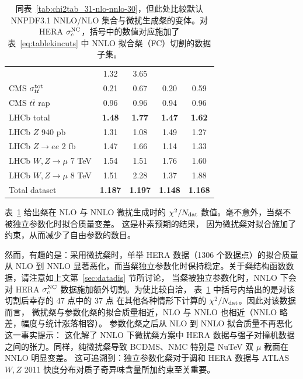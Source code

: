 \begin{table}[h]
\begin{center}
\begin{tabular}{|l|c|c||c|c|}
 &    1.32    &   3.65 \\
CMS $\sigma_{tt}^{\rm tot}$        &   0.21      &   0.67  &    0.20      &   0.59  \\
CMS $t\bar{t}$ rap       &   0.96      &   0.96
&    0.94      &   0.96 \\
\hline 
LHCb total      &   {\bf 1.48}      &  {\bf 1.77 }
&  {\bf  1.47}      &   {\bf 1.62}  \\
LHCb $Z$ 940 pb      &   1.31     &   1.08 &    1.49      &   1.27  \\
LHCb $Z\to ee$ 2 fb      &   1.47     &   1.66
 &    1.14      &   1.33 \\
LHCb $W,Z \to \mu$ 7 TeV       &   1.54      &   1.51
&    1.76      &   1.60 \\
LHCb $W,Z \to \mu$ 8 TeV       &   1.51     &   2.28
 &    1.37     &   1.88 \\
\hline
\hline
Total dataset \bf     &\bf   1.187    & \bf  1.197   &  \bf  1.148      & \bf  1.168 \\
\hline
\end{tabular}
\caption{\small 同表~\ref{tab:chi2tab_31-nlo-nnlo-30}，但此处比较默认 NNPDF3.1 NNLO/NLO 集合与微扰生成粲的变体。对 HERA $\sigma_c^{\rm NC}$，括号中的数值对应施加了表~\ref{eq:tablekincuts} 中 NNLO 拟合粲（FC）切割的数据子集。
\label{tab:chi2tab_31-nlo-nnlo-30-pc}}
\end{center}
\end{table}


表~\ref{tab:chi2tab_31-nlo-nnlo-30-pc} 给出粲在 NLO 与 NNLO 微扰生成时的 $\chi^2/N_{\rm dat}$ 数值。毫不意外，当粲不被独立参数化时拟合质量变差。
这是朴素预期的结果，
因为微扰粲对拟合施加了约束，从而减少了自由参数的数目。

 然而，有趣的是：采用微扰粲时，单举 HERA 数据（1306 个数据点）的拟合质量
 从 NLO 到 NNLO 显著恶化，而当粲独立参数化时保持稳定。关于粲结构函数数据，请注意如上文第~\ref{sec:datadis} 节所讨论，
 当粲被独立参数化时，NNLO 下会对 HERA $\sigma_c^{\rm NC}$ 数据施加额外切割。为使比较自洽，
 表~\ref{tab:chi2tab_31-nlo-nnlo-30-pc} 中括号内给出的是对该切割后幸存的 47 点中的 37 点
 在其他各种情形下计算的 $\chi^2/N_{\rm dat}$。因此对该数据而言，
 微扰粲与参数化粲的拟合质量相近，NLO 与 NNLO 也相近（NNLO 略差，幅度与统计涨落相容）。
 参数化粲之后从 NLO 到 NNLO 拟合质量不再恶化这一事实提示：
 这化解了 NNLO 下微扰粲方案中 HERA 数据与强子对撞机数据之间的张力。同样，纯微扰粲导致 BCDMS、NMC 特别是 NuTeV 双 $\mu$ 截面在 NNLO 明显变差。
 这可追溯到：独立参数化粲对于调和 HERA 数据与 ATLAS $W,Z$ 2011 快度分布对质子奇异味含量所加约束至关重要。


